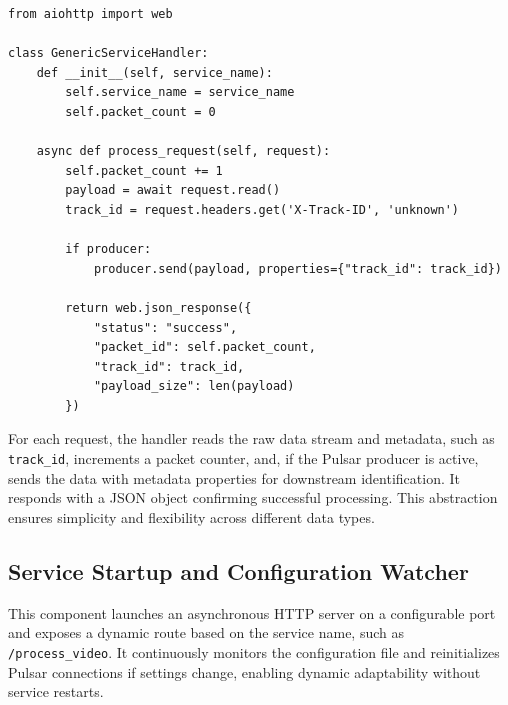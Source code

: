 \begin{lstlisting}[breaklines=true,basicstyle=\small\ttfamily,frame=single]
from aiohttp import web

class GenericServiceHandler:
    def __init__(self, service_name):
        self.service_name = service_name
        self.packet_count = 0

    async def process_request(self, request):
        self.packet_count += 1
        payload = await request.read()
        track_id = request.headers.get('X-Track-ID', 'unknown')

        if producer:
            producer.send(payload, properties={"track_id": track_id})

        return web.json_response({
            "status": "success",
            "packet_id": self.packet_count,
            "track_id": track_id,
            "payload_size": len(payload)
        })
\end{lstlisting}

For each request, the handler reads the raw data stream and metadata, such as \texttt{track\_id}, increments a packet counter, and, if the Pulsar producer is active, sends the data with metadata properties for downstream identification. It responds with a JSON object confirming successful processing. This abstraction ensures simplicity and flexibility across different data types.

\subsection{Service Startup and Configuration Watcher}
This component launches an asynchronous HTTP server on a configurable port and exposes a dynamic route based on the service name, such as \texttt{/process\_video}. It continuously monitors the configuration file and reinitializes Pulsar connections if settings change, enabling dynamic adaptability without service restarts.

